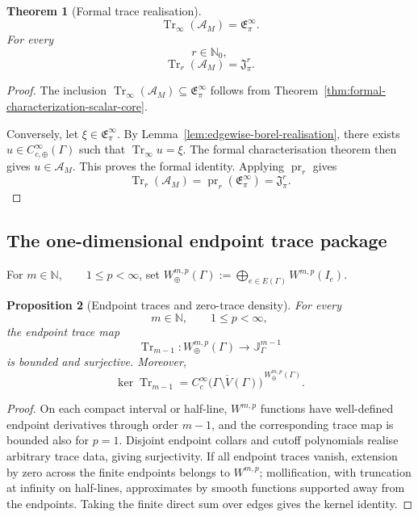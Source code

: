 \documentclass[11pt]{article}
\theoremstyle{plain}
\newtheorem{theorem}{Theorem}[section]
\newtheorem{proposition}[theorem]{Proposition}
\theoremstyle{definition}
\begin{document}
\begin{theorem}[Formal trace realisation]
\label{thm:graph-formal-trace-realisation}
\[
  \boxed{
  \operatorname{Tr}_\infty(\mathscr A_M)
  =
  \mathfrak E_\pi^\infty.
  }
\]
For every
\[
  r\in\mathbb N_0,
\]
\[
  \boxed{
  \operatorname{Tr}_r(\mathscr A_M)
  =
  \mathfrak J_\pi^r.
  }
\]
\end{theorem}

\begin{proof}
The inclusion \(\operatorname{Tr}_\infty(\mathscr A_M) \subseteq \mathfrak E_\pi^\infty\) follows from
Theorem~\ref{thm:formal-characterization-scalar-core}.

Conversely, let
\(\xi\in\mathfrak E_\pi^\infty\).
By
Lemma~\ref{lem:edgewise-borel-realisation},
there exists \(u\in C_{c,\oplus}^\infty(\Gamma)\) such that
\(\operatorname{Tr}_\infty u=\xi\).
The formal characterisation theorem then gives
\(u\in\mathscr A_M\).
This proves the formal identity. Applying
\(\operatorname{pr}_r\) gives
\[
  \operatorname{Tr}_r(\mathscr A_M)
  =
  \operatorname{pr}_r
  \left(
    \mathfrak E_\pi^\infty
  \right)
  =
  \mathfrak J_\pi^r.
\]
\end{proof}



\subsection{The one-dimensional endpoint trace package}
\label{subsec:graph-endpoint-trace-package}

For
\(m\in\mathbb N, \qquad 1\leq p<\infty\),
set
\(W_\oplus^{m,p}(\Gamma) := \bigoplus_{e\in E(\Gamma)} W^{m,p}(I_e)\).

\begin{proposition}[Endpoint traces and zero-trace density]
\label{prop:one-dimensional-trace-package}
For every
\[
  m\in\mathbb N,
  \qquad
  1\leq p<\infty,
\]
the endpoint trace map
\[
  \operatorname{Tr}_{m-1}:
  W_\oplus^{m,p}(\Gamma)
  \longrightarrow
  \mathbb J_\Gamma^{m-1}
\]
is bounded and surjective. Moreover,
\[
  \ker\operatorname{Tr}_{m-1}
  =
  \overline{
    C_c^\infty
    \bigl(
      \Gamma\setminus V(\Gamma)
    \bigr)
  }^{\,W_\oplus^{m,p}(\Gamma)}.
\]
\end{proposition}

\begin{proof}
On each compact interval or half-line, \(W^{m,p}\) functions have well-defined endpoint derivatives through order \(m-1\), and the corresponding trace map is bounded also for \(p=1\). Disjoint endpoint collars and cutoff polynomials realise arbitrary trace data, giving surjectivity. If all endpoint traces vanish, extension by zero across the finite endpoints belongs to \(W^{m,p}\); mollification, with truncation at infinity on half-lines, approximates by smooth functions supported away from the endpoints. Taking the finite direct sum over edges gives the kernel identity.
\end{proof}
\end{document}
